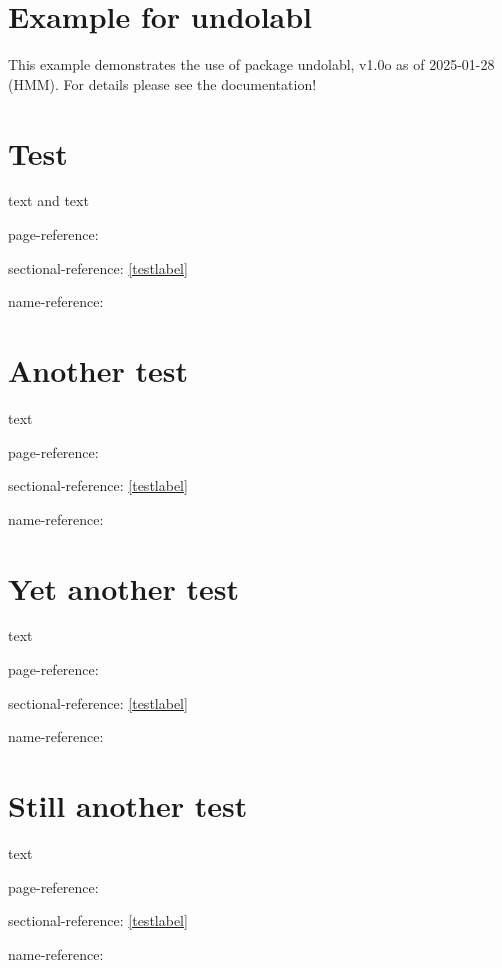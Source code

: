 \documentclass[british]{article}[2024/06/29]%
\begin{document}
\section*{Example for undolabl}
This example demonstrates the use of package\newline
\textsf{undolabl}, v1.0o as of 2025-01-28 (HMM).\newline
For details please see the documentation!
\bigskip

\section{Test}
text \label{testlabel} and text \par
page-reference: \pageref{testlabel}\par%
sectional-reference: \ref{testlabel}\par%
name-reference: %

\newpage
\section{Another test}
text \par
page-reference: \pageref{testlabel}\par%
sectional-reference: \ref{testlabel}\par%
name-reference: %

\newpage
\section{Yet another test}
text \par
page-reference: \pageref{testlabel}\par%
sectional-reference: \ref{testlabel}\par%
name-reference: %

\newpage
\section{Still another test}
text \par
page-reference: \pageref{testlabel}\par%
sectional-reference: \ref{testlabel}\par%
name-reference: %
\end{document}

